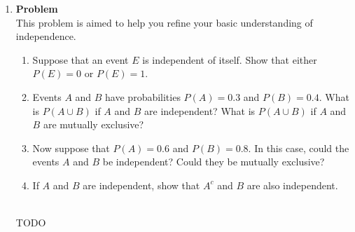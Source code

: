 \documentclass[12pt]{article}
\newenvironment{Ex}{\textbf{Problem}\vspace{.75em}\\}{}
\begin{document}
\begin{enumerate}
\begin{Ex}
\begin{solution}
\begin{enumerate}
\begin{equation}
            &= 35
          \end{equation}
          There are $15$ combinations involving a particular
          electrical engineer, so the probablility that one particular
          electrical engineer must be on the committee is
          $\frac{3}{7}$.
        \item The total number of possible combinations for all
          mechanical engineers in the group can be written as
          \begin{equation}
            \label{eq:6b-mat}
            \begin{pmatrix}
              5 \\ 3
            \end{pmatrix} &= \frac{5!}{3!4!}
            &= 10
          \end{equation}
          There are 3 combinations involving two particular mechanical
          engineers on the committee, so the probability that Two
          particular mechanical engineers cannot be together on the
          committee is $\frac{3}{10}$.
        \end{enumerate}
      \end{solution}
    \end{Ex}
  \item
    \begin{Ex}
      This problem is aimed to help you refine your basic
      understanding of independence.
      \begin{enumerate}
      \item Suppose that an event $E$ is independent of itself. Show
        that either $P(E) = 0$ or $P(E) = 1$.
      \item Events $A$ and $B$ have probabilities $P(A)=0.3$ and
        $P(B)=0.4$. What is $P(A \cup B)$ if $A$ and $B$ are
        independent? What is $P(A \cup B)$ if $A$ and $B$ are
        mutually exclusive?
      \item Now suppose that $P(A) = 0.6$ and $P(B) = 0.8$. In this
        case, could the events $A$ and $B$ be independent? Could they
        be mutually exclusive?
      \item If $A$ and $B$ are independent, show that $A^c$ and $B$
        are also independent.
      \end{enumerate}
      \begin{solution} \hfill \\
        {\huge TODO}
      \end{solution}
    \end{Ex}

\end{enumerate}
\end{document}

